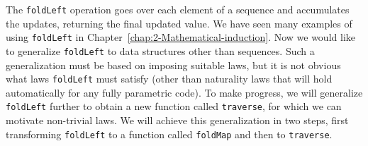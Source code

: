 The \lstinline!foldLeft! operation goes over each element of a sequence
and accumulates the updates, returning the final updated value. We
have seen many examples of using \lstinline!foldLeft! in Chapter~\ref{chap:2-Mathematical-induction}.
Now we would like to generalize \lstinline!foldLeft! to data structures
other than sequences. Such a generalization must be based on imposing
suitable laws, but it is not obvious what laws \lstinline!foldLeft!
must satisfy (other than naturality laws that will hold automatically
for any fully parametric code). To make progress, we will generalize
\lstinline!foldLeft! further to obtain a new function called \lstinline!traverse!,
for which we can motivate non-trivial laws. We will achieve this generalization
in two steps, first transforming \lstinline!foldLeft! to a function
called \lstinline!foldMap! and then to \lstinline!traverse!. 

